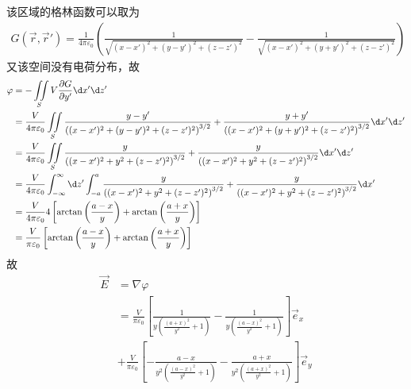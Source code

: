 \documentclass{phyasgn}
\begin{document}
\begin{sol}[1]
  该区域的格林函数可以取为
  \begin{align*}
    G(\vec{r},\vec{r}')=\frac{1}{4\pi\varepsilon_0}\left(\frac{1}{\sqrt{(x-x')^2+(y-y')^2+(z-z')^2}}-\frac{1}{\sqrt{(x-x')^2+(y+y')^2+(z-z')^2}}\right)
  \end{align*}
  又该空间没有电荷分布，故
  \begin{align*}
    \varphi&=-\iint\limits_SV\frac{\partial G}{\partial y'}\d x'\d z'\\
    &=\frac{V}{4\pi\varepsilon_0}\iint\limits_S\frac{y-y'}{\left((x-x')^2+(y-y')^2+(z-z')^2\right)^{3/2}}+\frac{y+y'}{\left((x-x')^2+(y+y')^2+(z-z')^2\right)^{3/2}}\d x'\d z'\\
    &=\frac{V}{4\pi\varepsilon_0}\iint\limits_S\frac{y}{\left((x-x')^2+y^2+(z-z')^2\right)^{3/2}}+\frac{y}{\left((x-x')^2+y^2+(z-z')^2\right)^{3/2}}\d x'\d z'\\
    &=\frac{V}{4\pi\varepsilon_0}\int_{-\infty}^{\infty}\d z'\int_{-a}^{a}\frac{y}{\left((x-x')^2+y^2+(z-z')^2\right)^{3/2}}+\frac{y}{\left((x-x')^2+y^2+(z-z')^2\right)^{3/2}}\d x'\\
    &=\frac{V}{4\pi\varepsilon_0}4 \left[\arctan\left(\frac{a-x}{y}\right)+\arctan\left(\frac{a+x}{y}\right)\right]\\
    &=\frac{V}{\pi\varepsilon_0}\left[\arctan\left(\frac{a-x}{y}\right)+\arctan\left(\frac{a+x}{y}\right)\right]
  \end{align*}
  故
  \begin{align*}
    \vec{E}&=\nabla\varphi\\
    &=\frac{V}{\pi\varepsilon_0}\left[\frac{1}{y \left(\frac{(a+x)^2}{y^2}+1\right)}-\frac{1}{y \left(\frac{(a-x)^2}{y^2}+1\right)}\right]\vec{e}_x\\
    &+\frac{V}{\pi\varepsilon_0}\left[-\frac{a-x}{y^2 \left(\frac{(a-x)^2}{y^2}+1\right)}-\frac{a+x}{y^2 \left(\frac{(a+x)^2}{y^2}+1\right)}\right]\vec{e}_y
  \end{align*}
\end{sol}
\end{document}
